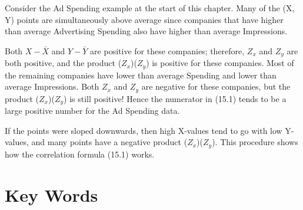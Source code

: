 \documentclass[11pt]{book}\usepackage[]{graphicx}\usepackage[]{color}
\begin{document}
Consider the Ad Spending example at the start of this chapter.  Many of the (X, Y) points are simultaneously above average since companies that have higher than average Advertising Spending also have higher than average Impressions.  

Both $X - \bar{X}$  and $Y - \bar{Y}$ are positive for these companies; therefore, $Z_x$  and $Z_y$  are both positive, and the product ($Z_x$)($Z_y$)  is positive for these companies.  Most of the remaining companies have lower than average Spending and lower than average Impressions.  Both $Z_x$  and $Z_y$  are negative for these companies, but the product ($Z_x$)($Z_y$) is still positive!  Hence the numerator in (15.1) tends to be a large positive number for the Ad Spending data.

If the points were sloped downwards, then high X-values tend to go with low Y-values, and many points have a negative product ($Z_x$)($Z_y$).  This procedure shows how the correlation formula (15.1) works.  



\section{Key Words}

\end{document}
